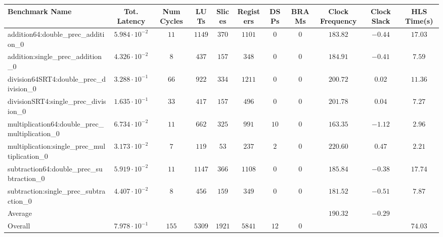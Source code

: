 \begin{tabular}{|l|c|c|c|c|c|c|c|c|c|c|}
\hline
Benchmark Name                                   & Tot. Latency            & Num Cycles & LUTs     & Slices   & Registers & DSPs   & BRAMs & Clock Frequency & Clock Slack & HLS Time(s) \\
\hline
addition64:double\_prec\_addition\_0             & $ 5.984 \cdot 10^{-2} $ & $ 11     $ & $ 1149 $ & $ 370  $ & $ 1101  $ & $ 0  $ & $ 0 $ & $ 183.82      $ & $ -0.44   $ & $ 17.03   $ \\
addition:single\_prec\_addition\_0               & $ 4.326 \cdot 10^{-2} $ & $ 8      $ & $ 437  $ & $ 157  $ & $ 348   $ & $ 0  $ & $ 0 $ & $ 184.91      $ & $ -0.41   $ & $ 7.59    $ \\
division64SRT4:double\_prec\_division\_0         & $ 3.288 \cdot 10^{-1} $ & $ 66     $ & $ 922  $ & $ 334  $ & $ 1211  $ & $ 0  $ & $ 0 $ & $ 200.72      $ & $ 0.02    $ & $ 11.36   $ \\
divisionSRT4:single\_prec\_division\_0           & $ 1.635 \cdot 10^{-1} $ & $ 33     $ & $ 417  $ & $ 157  $ & $ 496   $ & $ 0  $ & $ 0 $ & $ 201.78      $ & $ 0.04    $ & $ 7.27    $ \\
multiplication64:double\_prec\_multiplication\_0 & $ 6.734 \cdot 10^{-2} $ & $ 11     $ & $ 662  $ & $ 325  $ & $ 991   $ & $ 10 $ & $ 0 $ & $ 163.35      $ & $ -1.12   $ & $ 2.96    $ \\
multiplication:single\_prec\_multiplication\_0   & $ 3.173 \cdot 10^{-2} $ & $ 7      $ & $ 119  $ & $ 53   $ & $ 237   $ & $ 2  $ & $ 0 $ & $ 220.60      $ & $ 0.47    $ & $ 2.21    $ \\
subtraction64:double\_prec\_subtraction\_0       & $ 5.919 \cdot 10^{-2} $ & $ 11     $ & $ 1147 $ & $ 366  $ & $ 1108  $ & $ 0  $ & $ 0 $ & $ 185.84      $ & $ -0.38   $ & $ 17.74   $ \\
subtraction:single\_prec\_subtraction\_0         & $ 4.407 \cdot 10^{-2} $ & $ 8      $ & $ 456  $ & $ 159  $ & $ 349   $ & $ 0  $ & $ 0 $ & $ 181.52      $ & $ -0.51   $ & $ 7.87    $ \\
\hline
Average                                          & $                     $ & $        $ & $      $ & $      $ & $       $ & $    $ & $   $ & $ 190.32      $ & $ -0.29   $ & $         $ \\
\hline
Overall                                          & $ 7.978 \cdot 10^{-1} $ & $ 155    $ & $ 5309 $ & $ 1921 $ & $ 5841  $ & $ 12 $ & $ 0 $ & $             $ & $         $ & $ 74.03   $ \\
\hline
\end{tabular}
